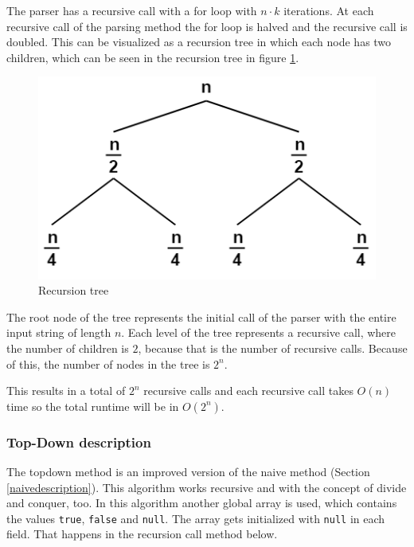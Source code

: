 \documentclass[a4paper, 11pt]{article}
\begin{document}
The parser has a recursive call with a for loop with $n \cdot k$ iterations. At each recursive call of the parsing method the for loop is halved and the recursive call is doubled. This can be visualized as a recursion tree in which each node has two children, which can be seen in the recursion tree in figure \ref{rt}.

\begin{figure}[H]
\begin{center}
\includegraphics[scale=0.6]{images/rt.png}
\caption{Recursion tree \cite{picrt}}
\label{rt}
\end{center}
\end{figure}

The root node of the tree represents the initial call of the parser with the entire input string of length $n$. Each level of the tree represents a recursive call, where the number of children is $2$, because that is the number of recursive calls. Because of this, the number of nodes in the tree is $2^n$.

This results in a total of $2^n$ recursive calls and each recursive call takes $O(n)$ time so the total runtime will be in $O(2^n)$.





\subsubsection{Top-Down description}
\label{topdowndescription}


The topdown method is an improved version of the naive method (Section \ref{naivedescription}). This algorithm works recursive and with the concept of divide and conquer, too. In this algorithm another global array is used, which contains the values \texttt{true}, \texttt{false} and \texttt{null}. The array gets initialized with \texttt{null} in each field. That happens in the recursion call method below.
\end{document}
